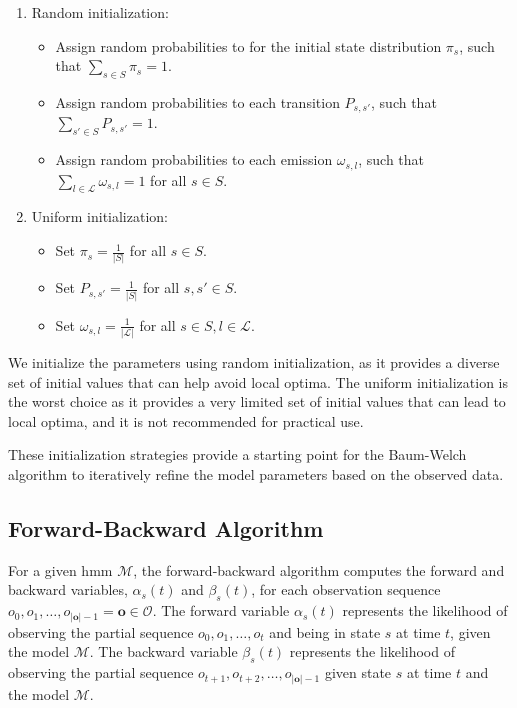 \begin{enumerate}
    \item Random initialization: 
    \begin{itemize}
        \item Assign random probabilities to for the initial state distribution $\pi_s$, such that $\sum_{s \in S} \pi_s = 1$.
        \item Assign random probabilities to each transition $P_{s, s'}$, such that $\sum_{s' \in S} P_{s, s'} = 1$.
        \item Assign random probabilities to each emission $\omega_{s, l}$, such that $\sum_{l \in \mathcal{L}} \omega_{s, l} = 1$ for all $s \in S$.
    \end{itemize}
    \item Uniform initialization: 
    \begin{itemize}
        \item Set $\pi_s = \frac{1}{|S|}$ for all $s \in S$.
        \item Set $P_{s, s'} = \frac{1}{|S|}$ for all $s, s' \in S$.
        \item Set $\omega_{s, l} = \frac{1}{|\mathcal{L}|}$ for all $s \in S, l \in \mathcal{L}$.
    \end{itemize}
\end{enumerate}

We initialize the parameters using random initialization, as it provides a diverse set of initial values that can help avoid local optima.
The uniform initialization is the worst choice as it provides a very limited set of initial values that can lead to local optima, and it is not recommended for practical use.

These initialization strategies provide a starting point for the Baum-Welch algorithm to iteratively refine the model parameters based on the observed data.

\subsection{Forward-Backward Algorithm}\label{subsec:forward-backwards_algorithm}
For a given \gls{hmm} $\mathcal{M}$, the forward-backward algorithm computes the forward and backward variables, $\alpha_s(t)$ and $\beta_s(t)$, for each observation sequence $o_0, o_1, \dots, o_{|\mathbf{o}|-1} = \mathbf{o} \in \mathcal{O}$.
The forward variable $\alpha_s(t)$ represents the likelihood of observing the partial sequence $o_0, o_1, \dots, o_t$ and being in state $s$ at time $t$, given the model $\mathcal{M}$.
The backward variable $\beta_s(t)$ represents the likelihood of observing the partial sequence $o_{t+1}, o_{t+2}, \dots, o_{|\mathbf{o}|-1}$ given state $s$ at time $t$ and the model $\mathcal{M}$.

